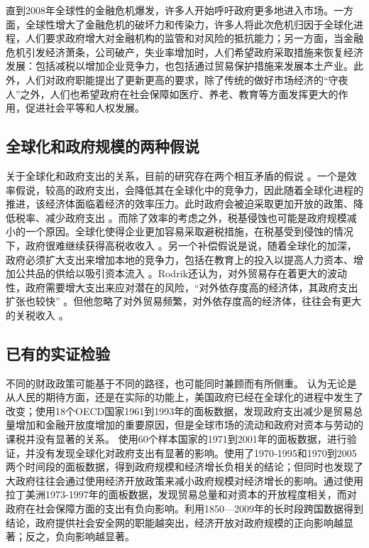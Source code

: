 \documentclass[10pt]{article}
\begin{document}
直到2008年全球性的金融危机爆发，许多人开始呼吁政府更多地进入市场。一方面，全球性增大了金融危机的破坏力和传染力，许多人将此次危机归因于全球化进程，人们要求政府增大对金融机构的监管和对风险的抵抗能力；另一方面，当金融危机引发经济萧条，公司破产，失业率增加时，人们希望政府采取措施来恢复经济发展：包括减税以增加企业竞争力，也包括通过贸易保护措施来发展本土产业。此外，人们对政府职能提出了更新更高的要求，除了传统的做好市场经济的“守夜人”之外，人们也希望政府在社会保障如医疗、养老、教育等方面发挥更大的作用，促进社会平等和人权发展。
\subsection{全球化和政府规模的两种假说}
关于全球化和政府支出的关系，目前的研究存在两个相互矛盾的假说 \cite{garrett2001globalization} 。一个是效率假说，较高的政府支出，会降低其在全球化中的竞争力，因此随着全球化进程的推进，该经济体面临着经济的效率压力。此时政府会被迫采取更加开放的政策、降低税率、减少政府支出 \cite{wangyu2014} 。而除了效率的考虑之外，税基侵蚀也可能是政府规模减小的一个原因。全球化使得企业更加容易采取避税措施，在税基受到侵蚀的情况下，政府很难继续获得高税收收入 \cite{tanzi2000globalization} 。另一个补偿假说是说，随着全球化的加深，政府必须扩大支出来增加本地的竞争力，包括在教育上的投入以提高人力资本、增加公共品的供给以吸引资本流入 \cite{rodrik1998more} 。Rodrik还认为，对外贸易存在着更大的波动性，政府需要增大支出来应对潜在的风险，“对外依存度高的经济体，其政府支出扩张也较快”  \cite{rodrik1998more} 。但他忽略了对外贸易频繁，对外依存度高的经济体，往往会有更大的关税收入 \cite{tanzi1973theory}。
\subsection{已有的实证检验}
不同的财政政策可能基于不同的路径，也可能同时兼顾而有所侧重。\cite{kettl2000transformation} 认为无论是从人民的期待方面，还是在实际的功能上，美国政府已经在全球化的进程中发生了改变；\cite{garrett2001globalization}使用18个OECD国家1961到1993年的面板数据，发现政府支出减少是贸易总量增加和金融开放度增加的重要原因，但是全球市场的流动和政府对资本与劳动的课税并没有显著的关系。\cite{dreher2008impact} 使用60个样本国家的1971到2001年的面板数据，进行验证，并没有发现全球化对政府支出有显著的影响。\cite{bergh2010government}使用了1970-1995和1970到2005两个时间段的面板数据，得到政府规模和经济增长负相关的结论；但同时也发现了大政府往往会通过使用经济开放政策来减小政府规模对经济增长的影响。\cite{kaufman2001globalization}通过使用拉丁美洲1973-1997年的面板数据，发现贸易总量和对资本的开放程度相关，而对政府在社会保障方面的支出有负向影响。\cite{maojie2015}利用1850—2009年的长时段跨国数据得到结论，政府提供社会安全网的职能越突出，经济开放对政府规模的正向影响越显著；反之，负向影响越显著。
\end{document}
